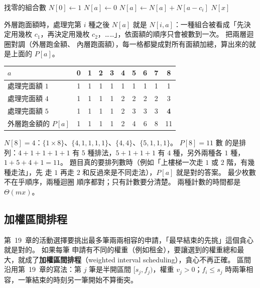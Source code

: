 \begin{pseudo}[label=alg:dp-coin-ways]{找零的組合數}
    \State $N[0] \gets 1$
        \State $N[a] \gets 0$
    \EndFor
     
            \State $N[a] \gets N[a] + N[a - c_i]$
        \EndFor
    \EndFor
    \State \Return $N[x]$
\EndFunction
\end{pseudo}

外層跑面額時，處理完第 $i$ 種之後 $N[a]$ 就是 $N[i, a]$：一種組合被看成「先決定用幾枚
$c_1$，再決定用幾枚 $c_2$，……」，依面額的順序只會被數到一次。 把兩層迴圈對調（外層跑金額、
內層跑面額），每一格都變成對所有面額加總，算出來的就是上面的 $P[a]$。

\begin{center}
\small
\begin{tabular}{l*{9}{c}}
\toprule
$a$ & 0 & 1 & 2 & 3 & 4 & 5 & 6 & 7 & 8 \\
\midrule
處理完面額 $1$ & 1 & 1 & 1 & 1 & 1 & 1 & 1 & 1 & 1 \\
處理完面額 $4$ & 1 & 1 & 1 & 1 & 2 & 2 & 2 & 2 & 3 \\
處理完面額 $5$ & 1 & 1 & 1 & 1 & 2 & 3 & 3 & 3 & \textbf{4} \\
\midrule
外層跑金額的 $P[a]$ & 1 & 1 & 1 & 1 & 2 & 4 & 6 & 8 & 11 \\
\bottomrule
\end{tabular}
\end{center}

$N[8] = 4$：$\{1 \times 8\}$、$\{4, 1, 1, 1, 1\}$、$\{4, 4\}$、$\{5, 1, 1, 1\}$。 $P[8] = 11$ 數
的是排列：$4 + 1 + 1 + 1 + 1$ 有 $5$ 種排法，$5 + 1 + 1 + 1$ 有 $4$ 種，另外兩種各 $1$ 種，
$1 + 5 + 4 + 1 = 11$。 題目真的要排列數時（例如「上樓梯一次走 $1$ 或 $2$ 階，有幾種走法」，先
走 $1$ 再走 $2$ 和反過來是不同走法），$P[a]$ 就是對的答案。 最少枚數不在乎順序，兩種迴圈
順序都對；只有計數要分清楚。 兩種計數的時間都是 $\Theta(mx)$。

\subsection{加權區間排程}
\label{sec:dp-wis}

第~19~章的活動選擇要挑出最多筆兩兩相容的申請，「最早結束的先挑」這個貪心就是對的。 如果每筆
申請有不同的權重（例如租金），要讓選到的權重總和最大，就成了\textbf{加權區間排程}（weighted
interval scheduling），貪心不再正確。 區間沿用第~19~章的寫法：第 $j$ 筆是半開區間
$[s_j, f_j)$，權重 $v_j > 0$；$f_i \le s_j$ 時兩筆相容，一筆結束的時刻另一筆開始不算衝突。

